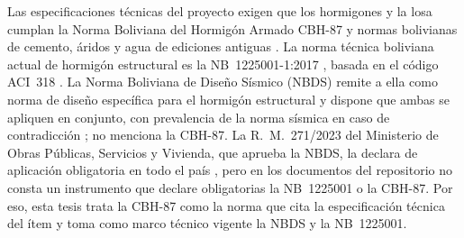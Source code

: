 Las especificaciones técnicas del proyecto exigen que los hormigones y la losa cumplan la Norma Boliviana del Hormigón Armado CBH-87 y normas bolivianas de cemento, áridos y agua de ediciones antiguas \parencite[pp.~1--3]{uatf_et}. La norma técnica boliviana actual de hormigón estructural es la NB~1225001-1:2017 \parencite{nb1225001_2017}, basada en el código ACI~318 \parencite[p.~4]{cocarico2022}. La Norma Boliviana de Diseño Sísmico (NBDS) remite a ella como norma de diseño específica para el hormigón estructural y dispone que ambas se apliquen en conjunto, con prevalencia de la norma sísmica en caso de contradicción \parencite[arts.~1 y 10, pp.~1, 19]{mopsv2023nbds}; no menciona la CBH-87. La R.~M.~271/2023 del Ministerio de Obras Públicas, Servicios y Vivienda, que aprueba la NBDS, la declara de aplicación obligatoria en todo el país \parencite[R.~M.~271/2023, resuelve tercero]{mopsv2023nbds}, pero en los documentos del repositorio no consta un instrumento que declare obligatorias la NB~1225001 o la CBH-87. Por eso, esta tesis trata la CBH-87 como la norma que cita la especificación técnica del ítem y toma como marco técnico vigente la NBDS y la NB~1225001. 

